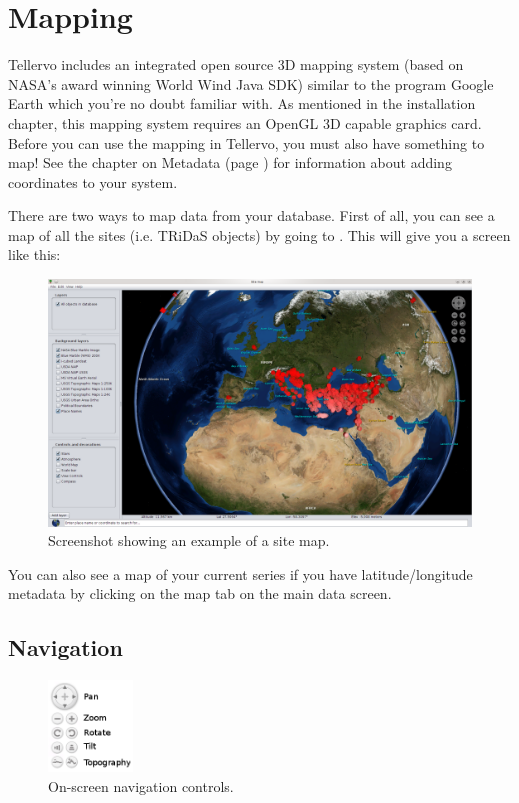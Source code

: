 \chapter{Mapping}
Tellervo includes an integrated open source 3D mapping system (based on NASA's award winning World Wind Java SDK) similar to the program Google Earth which you're no doubt familiar with. As mentioned in the installation chapter, this mapping system requires an OpenGL 3D capable graphics card. Before you can use the mapping in Tellervo, you must also have something to map! See the chapter on Metadata (page \pageref{txt:metadata}) for information about adding coordinates to your system.

There are two ways to map data from your database. First of all, you can see a map of all the sites (i.e. TRiDaS objects) by going to . This will give you a screen like this:

\begin{figure}[hbtp]
  \label{fig:map}
  \centering
  \includegraphics[width=\textwidth]{Images/sitemap.png}
  \caption{Screenshot showing an example of a site map.}
\end{figure}


You can also see a map of your current series if you have latitude/longitude metadata by clicking on the map tab on the main data screen.  
\newpage

\section{Navigation}
\begin{figure}[hbtp]
  \label{fig:wwjcontrols}
  \centering
  \includegraphics[width=0.2\textwidth]{Images/wwjcontrols.png}
  \caption{On-screen navigation controls.}
\end{figure}

